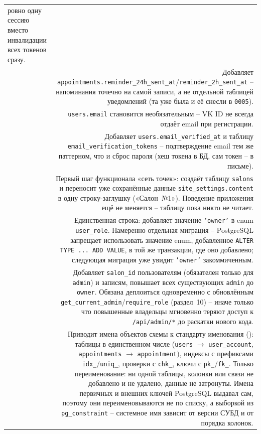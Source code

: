 \begin{xltabular}{\textwidth}{M D}
  ровно одну сессию вместо инвалидации всех токенов сразу. \\
 & Добавляет
  \texttt{appointments.reminder_24h_sent_at}/\texttt{reminder_2h_sent_at}
  -- напоминания точечно на самой записи, а не отдельной таблицей
  уведомлений (та уже была и её снесли в \texttt{0005}). \\
 & \texttt{users.email} становится
  необязательным -- VK ID не всегда отдаёт email при регистрации. \\
 & Добавляет
  \texttt{users.email_verified_at} и таблицу
  \texttt{email_verification_tokens} -- подтверждение email тем же
  паттерном, что и сброс пароля (хеш токена в БД, сам токен -- в письме). \\
 & Первый шаг функционала «сеть точек»: создаёт
  таблицу \texttt{salons} и переносит уже сохранённые данные
  \texttt{site_settings.content} в одну строку-заглушку («Салон~№1»).
  Поведение приложения ещё не меняется -- таблицу пока никто не читает. \\
 & Единственная строка: добавляет
  значение \texttt{'owner'} в enum \texttt{user_role}. Намеренно
  отдельная миграция -- PostgreSQL запрещает использовать значение enum,
  добавленное \texttt{ALTER TYPE ... ADD VALUE}, в той же транзакции, где
  оно добавлено; следующая миграция уже увидит \texttt{'owner'}
  закоммиченным. \\
 & Добавляет \texttt{salon_id} пользователям
  (обязателен только для \texttt{admin}) и записям, повышает всех
  существующих \texttt{admin} до \texttt{owner}. Обязана деплоиться
  одновременно с обновлённым \texttt{get_current_admin}/\texttt{require_role}
  (раздел~10) -- иначе только что повышенные владельцы мгновенно теряют
  доступ к \texttt{/api/admin/*} до раскатки нового кода. \\
 & Приводит имена объектов схемы к стандарту
  именования (): таблицы в
  единственном числе (\texttt{users} $\to$ \texttt{user\_account},
  \texttt{appointments} $\to$ \texttt{appointment}), индексы с
  префиксами \texttt{idx\_}/\texttt{uniq\_}, проверки с
  \texttt{chk\_}, ключи с \texttt{pk\_}/\texttt{fk\_}. Только
  переименование: ни одной таблицы, колонки или связи не добавлено и не
  удалено, данные не затронуты. Имена первичных и внешних ключей
  PostgreSQL выдавал сам, поэтому они переименовываются не по списку, а
  выборкой из \texttt{pg\_constraint} -- системное имя зависит от
  версии СУБД и от порядка колонок. \\
\end{xltabular}

